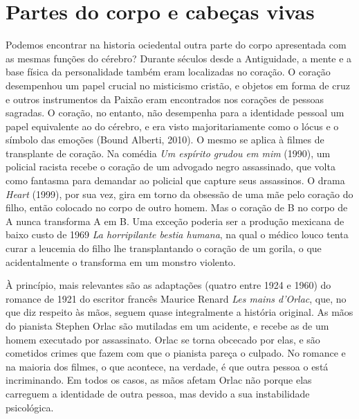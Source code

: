 \chapter{Partes do corpo e cabeças vivas}

Podemos encontrar na historia ociedental outra parte do corpo
apresentada com as mesmas funções do cérebro? Durante séculos desde a
Antiguidade, a mente e a base física da personalidade também eram
localizadas no coração. O coração desempenhou um papel crucial no
misticismo cristão, e objetos em forma de cruz e outros instrumentos da
Paixão eram encontrados nos corações de pessoas sagradas. O coração, no
entanto, não desempenha para a identidade pessoal um papel equivalente
ao do cérebro, e era visto majoritariamente como o lócus e o símbolo das
emoções (Bound Alberti, 2010). O mesmo se aplica à filmes de transplante
de coração. Na comédia \emph{Um espírito grudou em mim} (1990), um
policial racista recebe o coração de um advogado negro assassinado, que
volta como fantasma para demandar ao policial que capture seus
assassinos. O drama \emph{Heart} (1999), por sua vez, gira em torno da
obsessão de uma mãe pelo coração do filho, então colocado no corpo de
outro homem. Mas o coração de B no corpo de A nunca transforma A em B.
Uma exceção poderia ser a produção mexicana de baixo custo de 1969
\emph{La horripilante bestia humana}, na qual o médico louco tenta curar
a leucemia do filho lhe transplantando o coração de um gorila, o que
acidentalmente o transforma em um monstro violento.

À princípio, mais relevantes são as adaptações (quatro entre 1924 e
1960) do romance de 1921 do escritor francês Maurice Renard \emph{Les
mains d'Orlac}, que, no que diz respeito às mãos, seguem quase
integralmente a história original. As mãos do pianista Stephen Orlac são
mutiladas em um acidente, e recebe as de um homem executado por
assassinato. Orlac se torna obcecado por elas, e são cometidos crimes
que fazem com que o pianista pareça o culpado. No romance e na maioria
dos filmes, o que acontece, na verdade, é que outra pessoa o está
incriminando. Em todos os casos, as mãos afetam Orlac não porque elas
carreguem a identidade de outra pessoa, mas devido a sua instabilidade
psicológica.

